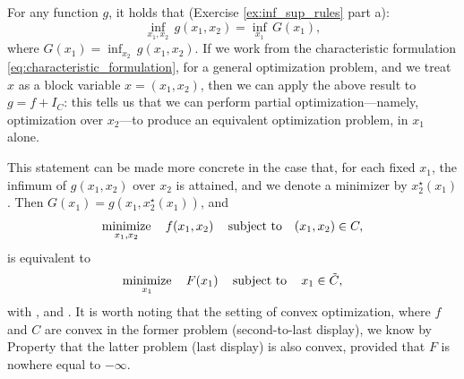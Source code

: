 For any function $g$, it holds that (Exercise \ref{ex:inf_sup_rules} part a):
\[
\inf_{x_1, x_2} \, g(x_1, x_2) = \inf_{x_1} \, G(x_1), 
\]
where $G(x_1) = \inf_{x_2} \, g(x_1,x_2)$. If we work from the characteristic 
formulation \eqref{eq:characteristic_formulation}, for a general optimization
problem, and we treat $x$ as a block variable $x=(x_1,x_2)$, then we can apply
the above result to $g = f + I_C$: this tells us that we can perform
partial optimization---namely, optimization over $x_2$---to produce an
equivalent optimization problem, in $x_1$ alone. 

This statement can be made more concrete in the case that, for each fixed $x_1$,
the infimum of $g(x_1,x_2)$ over $x_2$ is attained, and we denote a
minimizer by $x^\star_2(x_1)$. Then $G(x_1) = g(x_1, x^\star_2(x_1))$, and 
\[
\operatorname*{minimize}_{x_1,x_2} \quad f(x_1, x_2) \quad \operatorname{subject\,\,to} \quad (x_1,x_2) \in C, 
\]
is equivalent to 
\[
\operatorname*{minimize}_{x_1} \quad F(x_1) \quad \operatorname{subject\,\,to} \quad x_1 \in \tilde{C},
\]
with , and . It is worth noting that the setting of convex
optimization, where $f$ and $C$ are convex in the former problem (second-to-last  
display), we know by Property  that the latter
problem (last display) is also convex, provided that $F$ is nowhere equal to
$-\infty$.  

